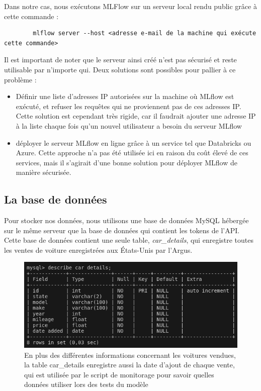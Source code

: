 \documentclass[french]{article}
\begin{document}
    Dans notre cas, nous exécutons MLFlow sur un serveur local rendu public grâce à cette commande :
    \begin{verbatim}
        mlflow server --host <adresse e-mail de la machine qui exécute cette commande>
    \end{verbatim}

    Il est important de noter que le serveur ainsi créé n'est pas sécurisé et reste utilisable par n'importe qui. Deux solutions sont possibles pour pallier à ce problème :
    \begin{itemize}
        \item Définir une liste d'adresses IP autorisées sur la machine où MLflow est exécuté, et refuser les requêtes qui ne proviennent pas de ces adresses IP. Cette solution est cependant très rigide, car il faudrait ajouter une adresse IP à la liste chaque fois qu'un nouvel utilisateur a besoin du serveur MLflow
        \item déployer le serveur MLflow en ligne grâce à un service tel que Databricks ou Azure. Cette approche n'a pas été utilisée ici en raison du coût élevé de ces services, mais il s'agirait d'une bonne solution pour déployer MLflow de manière sécurisée.
    \end{itemize}

    \subsection{La base de données}

    Pour stocker nos données, nous utilisons une base de données MySQL hébergée sur le même serveur que la base de données qui contient les tokens de l'API. Cette base de données contient une seule table, \textit{car\_details}, qui enregistre toutes les ventes de voiture enregistrées aux États-Unis par l'Argus.

    \begin{figure}[h!]
        \includegraphics[width=12cm]{car_details_table}
        \centering
        \caption{En plus des différentes informations concernant les voitures vendues, la table car\_details enregistre aussi la date d'ajout de chaque vente, qui est utilisée par le script de monitorage pour savoir quelles données utiliser lors des tests du modèle}
    \end{figure}
\end{document}
